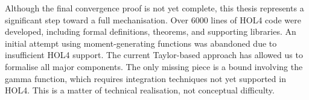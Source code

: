 Although the final convergence proof is not yet complete, this thesis represents a significant step toward a full mechanisation. Over 6000 lines of HOL4 code were developed, including formal definitions, theorems, and supporting libraries. An initial attempt using moment-generating functions was abandoned due to insufficient HOL4 support. The current Taylor-based approach has allowed us to formalise all major components. The only missing piece is a bound involving the gamma function, which requires integration techniques not yet supported in HOL4. This is a matter of technical realisation, not conceptual difficulty.
